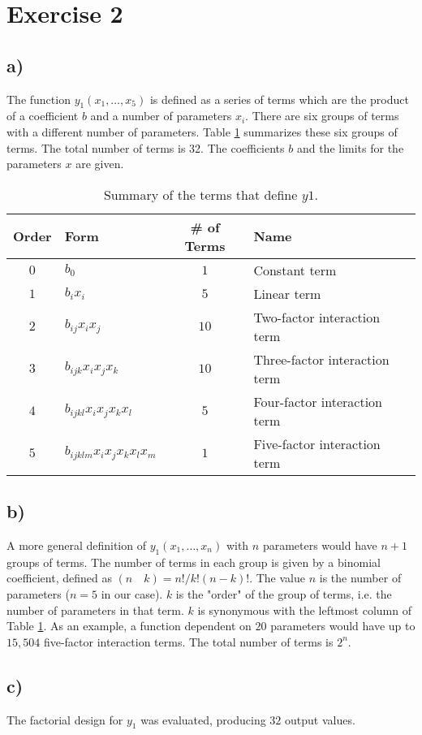 \section*{Exercise 2}

\subsection*{a)}

The function $y_1(x_1, \dots , x_5)$ is defined as a series of terms which are the product of a coefficient $b$ and a number of parameters $x_i$. There are six groups of terms with a different number of parameters. Table \ref{tab:funko_terms} summarizes these six groups of terms. The total number of terms is 32. The coefficients $b$ and the limits for the parameters $x$ are given. \cite{homework-w4}

\begin{table}[h!]
\centering
\begin{tabular}{c|lcl}
	Order & Form & \# of Terms & Name \\
	\hline
	$0$ & $b_0$ & $1$ & Constant term \\
	$1$ & $b_i x_i$ & $5$ & Linear term \\
	$2$ & $b_{ij} x_i x_j$ & $10$ & Two-factor interaction term \\
	$3$ & $b_{ijk} x_i x_j x_k$ & $10$ & Three-factor interaction term \\
	$4$ & $b_{ijkl} x_i x_j x_k x_l$ & $5$ & Four-factor interaction term \\
	$5$ & $b_{ijklm} x_i x_j x_k x_l x_m$ & $1$ & Five-factor interaction term \\
\end{tabular}
\caption{Summary of the terms that define $y1$.}
\label{tab:funko_terms}
\end{table}

\subsection*{b)}

A more general definition of $y_1(x_1, \dots, x_n)$ with $n$ parameters would have $n + 1$ groups of terms. The number of terms in each group is given by a binomial coefficient, defined as $(n \quad k) = n!/k!(n-k)!$. The value $n$ is the number of parameters ($n = 5$ in our case). $k$ is the "order" of the group of terms, i.e. the number of parameters in that term. $k$ is synonymous with the leftmost column of Table \ref{tab:funko_terms}. As an example, a function dependent on $20$ parameters would have up to $15,504$ five-factor interaction terms. The total number of terms is $2^n$.

\subsection*{c)}

The factorial design for $y_1$ was evaluated, producing $32$ output values.